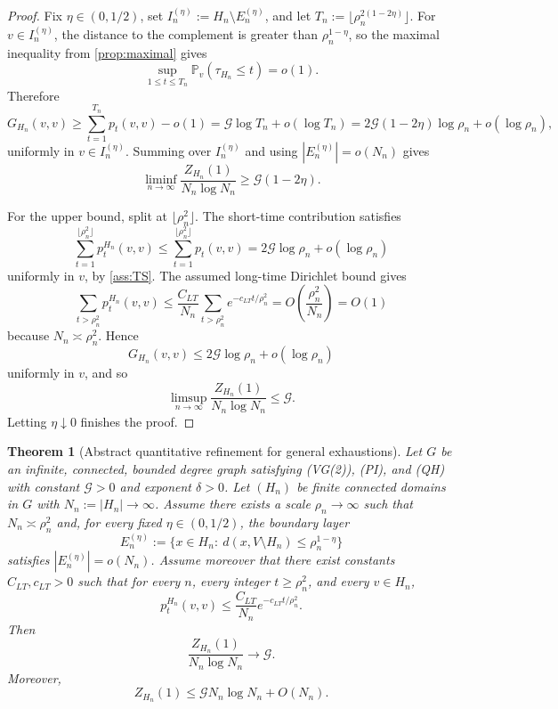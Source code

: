 \documentclass[reqno]{amsart}
\numberwithin{equation}{section}
\newtheorem{theorem}{Theorem}[section]
\theoremstyle{definition}
\theoremstyle{remark}
\newcommand{\Cref}[1]{\autoref{#1}}
\newcommand{\cG}{\mathcal{G}}
\newcommand{\Prob}{\mathbb{P}}
\begin{document}
\begin{proof}
Fix $\eta\in(0,1/2)$, set $I_n^{(\eta)}:=H_n\setminus E_n^{(\eta)}$, and let $T_n:=\lfloor \rho_n^{2(1-2\eta)}\rfloor$. For $v\in I_n^{(\eta)}$, the distance to the complement is greater than $\rho_n^{1-\eta}$, so the maximal inequality from \Cref{prop:maximal} gives
\[
  \sup_{1\le t\le T_n}\Prob_v(\tau_{H_n}\le t)=o(1).
\]
Therefore
\[
  G_{H_n}(v,v)\ge \sum_{t=1}^{T_n} p_t(v,v)-o(1)
  =\cG\log T_n+o(\log T_n)
  =2\cG(1-2\eta)\log \rho_n+o(\log \rho_n),
\]
uniformly in $v\in I_n^{(\eta)}$. Summing over $I_n^{(\eta)}$ and using $|E_n^{(\eta)}|=o(N_n)$ gives
\[
  \liminf_{n\to\infty}\frac{Z_{H_n}(1)}{N_n\log N_n}\ge \cG(1-2\eta).
\]

For the upper bound, split at $\lfloor \rho_n^2\rfloor$. The short-time contribution satisfies
\[
  \sum_{t=1}^{\lfloor \rho_n^2\rfloor} p_t^{H_n}(v,v)
  \le \sum_{t=1}^{\lfloor \rho_n^2\rfloor} p_t(v,v)
  = 2\cG\log \rho_n + o(\log \rho_n)
\]
uniformly in $v$, by \Cref{ass:TS}. The assumed long-time Dirichlet bound gives
\[
  \sum_{t>\rho_n^2} p_t^{H_n}(v,v)
  \le \frac{C_{LT}}{N_n}\sum_{t>\rho_n^2} e^{-c_{LT} t/\rho_n^2}
  = O\!\left(\frac{\rho_n^2}{N_n}\right)
  = O(1)
\]
because $N_n\asymp \rho_n^2$. Hence
\[
  G_{H_n}(v,v)\le 2\cG\log \rho_n+o(\log \rho_n)
\]
uniformly in $v$, and so
\[
  \limsup_{n\to\infty}\frac{Z_{H_n}(1)}{N_n\log N_n}\le \cG.
\]
Letting $\eta\downarrow0$ finishes the proof.
\end{proof}

\begin{theorem}[Abstract quantitative refinement for general exhaustions]\label{thm:general_exhaustion_qh}
Let $G$ be an infinite, connected, bounded degree graph satisfying \textup{(VG(2))}, \textup{(PI)}, and \textup{(QH)} with constant $\cG>0$ and exponent $\delta>0$. Let $(H_n)$ be finite connected domains in $G$ with $N_n:=|H_n|\to\infty$. Assume there exists a scale $\rho_n\to\infty$ such that $N_n\asymp \rho_n^2$ and, for every fixed $\eta\in(0,1/2)$, the boundary layer
\[
  E_n^{(\eta)}:=\{x\in H_n:\ d(x,V\setminus H_n)\le \rho_n^{1-\eta}\}
\]
satisfies $|E_n^{(\eta)}|=o(N_n)$. Assume moreover that there exist constants $C_{LT},c_{LT}>0$ such that for every $n$, every integer $t\ge \rho_n^2$, and every $v\in H_n$,
\[
  p_t^{H_n}(v,v)\le \frac{C_{LT}}{N_n} e^{-c_{LT}t/\rho_n^2}.
\]
Then
\[
  \frac{Z_{H_n}(1)}{N_n\log N_n}\longrightarrow \cG.
\]
Moreover,
\[
  Z_{H_n}(1)\le \cG N_n\log N_n + O(N_n).
\]
\end{theorem}
\end{document}
